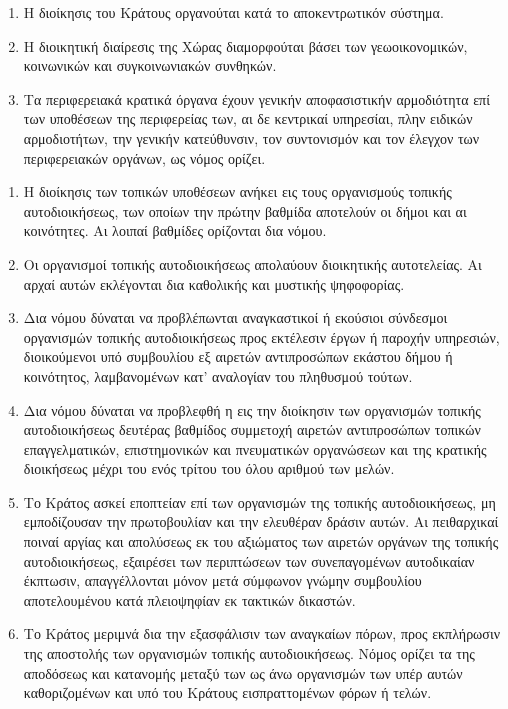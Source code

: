 \documentclass[twoside, a4paper, 10pt]{article}
\begin{document}
\begin{multicols}{2}
\begin{enumerate}
\begin{BigQuote}
\begin{enumerate}
  \item[1.] Η διοίκησις του Κράτους οργανούται κατά το αποκεντρωτικόν σύστημα.
  \item[2.] Η διοικητική διαίρεσις της Χώρας διαμορφούται βάσει των γεωοικονομικών, κοινωνικών και συγκοινωνιακών συνθηκών.
  \item[3.] Τα περιφερειακά κρατικά όργανα έχουν γενικήν αποφασιστικήν αρμοδιότητα επί των υποθέσεων της περιφερείας των, αι δε κεντρικαί υπηρεσίαι, πλην ειδικών αρμοδιοτήτων, την γενικήν κατεύθυνσιν, τον συντονισμόν και τον έλεγχον των περιφερειακών οργάνων, ως νόμος ορίζει.
\end{enumerate}

\begin{enumerate}
  \item[1.] Η διοίκησις των τοπικών υποθέσεων ανήκει εις τους οργανισμούς τοπικής αυτοδιοικήσεως, των οποίων την πρώτην βαθμίδα αποτελούν οι δήμοι και αι κοινότητες. Αι λοιπαί βαθμίδες ορίζονται δια νόμου.
  \item[2.] Οι οργανισμοί τοπικής αυτοδιοικήσεως απολαύουν διοικητικής αυτοτελείας. Αι αρχαί αυτών εκλέγονται δια καθολικής και μυστικής ψηφοφορίας.
  \item[3.] Δια νόμου δύναται να προβλέπωνται  αναγκαστικοί ή εκούσιοι σύνδεσμοι οργανισμών τοπικής αυτοδιοικήσεως προς εκτέλεσιν έργων ή παροχήν υπηρεσιών, διοικούμενοι υπό συμβουλίου εξ αιρετών αντιπροσώπων εκάστου δήμου ή κοινότητος, λαμβανομένων κατ' αναλογίαν του πληθυσμού τούτων.
  \item[4.] Δια νόμου δύναται να προβλεφθή η εις την διοίκησιν των οργανισμών τοπικής αυτοδιοικήσεως δευτέρας βαθμίδος συμμετοχή αιρετών αντιπροσώπων τοπικών επαγγελματικών, επιστημονικών και πνευματικών οργανώσεων και της κρατικής διοικήσεως μέχρι του ενός τρίτου του όλου αριθμού των μελών.
  \item[5.] Το Κράτος ασκεί εποπτείαν επί των οργανισμών της τοπικής αυτοδιοικήσεως, μη εμποδίζουσαν την πρωτοβουλίαν και την ελευθέραν δράσιν αυτών. Αι πειθαρχικαί ποιναί αργίας και απολύσεως εκ του αξιώματος των αιρετών οργάνων της τοπικής αυτοδιοικήσεως, εξαιρέσει των περιπτώσεων των συνεπαγομένων αυτοδικαίαν έκπτωσιν, απαγγέλλονται μόνον μετά σύμφωνον γνώμην συμβουλίου αποτελουμένου κατά πλειοψηφίαν εκ τακτικών δικαστών.
  \item[6.] Το Κράτος μεριμνά δια την εξασφάλισιν των αναγκαίων πόρων, προς εκπλήρωσιν της αποστολής των οργανισμών τοπικής αυτοδιοικήσεως. Νόμος ορίζει τα της αποδόσεως και κατανομής μεταξύ των ως άνω οργανισμών των υπέρ αυτών καθοριζομένων και υπό του Κράτους εισπραττομένων φόρων ή τελών.
\end{enumerate}


\end{BigQuote}
\end{enumerate}
\end{multicols}
\end{document}
